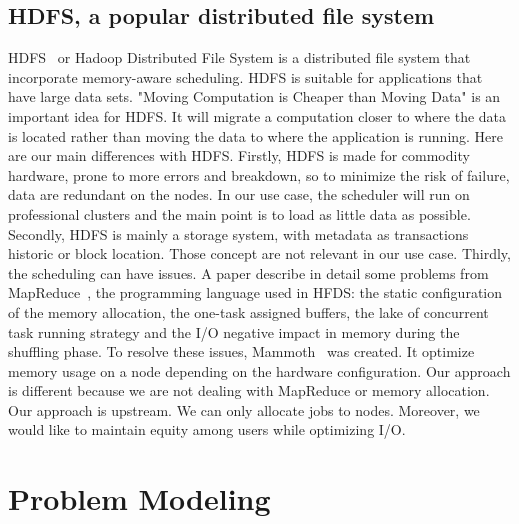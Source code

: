 \documentclass[a4paper]{article}
\begin{document}
\subsection{HDFS, a popular distributed file system}
HDFS~\cite{hdfs} or Hadoop Distributed File System is a distributed file system that incorporate memory-aware scheduling.
HDFS is suitable for applications that have large data sets. 
"Moving Computation is Cheaper than Moving Data" is an important idea for HDFS.
It will migrate a computation closer to where the data is located rather than moving the data to where
the application is running.
Here are our main differences with HDFS. Firstly, HDFS is made for commodity hardware, prone
to more errors and breakdown, so to minimize the risk of failure, data are redundant on the nodes.
In our use case, the scheduler will run on professional clusters and the main point is to load as 
little data as possible. Secondly, HDFS is mainly a storage system, with metadata as transactions historic or
block location. Those concept are not relevant in our use case. Thirdly, the scheduling 
can have issues. A paper describe in detail some problems from MapReduce~\cite{issue_with_hdfs}, the
programming language used in HFDS: the static configuration of the memory allocation, the one-task assigned buffers, the
lake of concurrent task running strategy and the I/O negative impact in memory during the shuffling phase.
To resolve these issues, Mammoth~\cite{Mammoth} was created. It optimize memory usage on a node depending on the hardware configuration.
Our approach is different because we are not dealing with MapReduce or memory allocation.
Our approach is upstream. We can only allocate jobs to nodes. Moreover, we would like to maintain
equity among users  while optimizing I/O.

\section{Problem Modeling}
\end{document}
